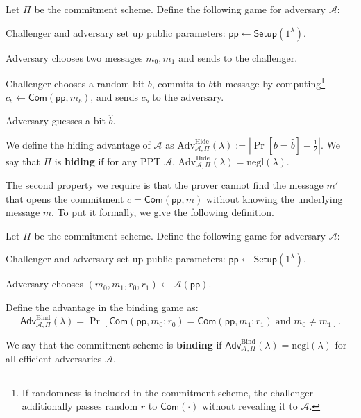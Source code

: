 \documentclass[../../book]{subfiles}
\begin{document}
\begin{definition}\label{def:hiding}
    Let $\Pi$ be the commitment scheme. Define the following game for adversary $\mathcal{A}$:
    \begin{algoen}
        \item Challenger and adversary set up public parameters: $\mathsf{pp} \gets \mathsf{Setup}(1^{\lambda})$.
        \item Adversary chooses two messages $m_0,m_1$ and sends to the challenger.
        \item Challenger chooses a random bit $b$, commits to $b$th message by computing\footnote{If randomness is included in the commitment scheme, the challenger additionally passes random $r$ to $\mathsf{Com}(\cdot)$ without revealing it to $\mathcal{A}$.} $c_b \gets \mathsf{Com}(\mathsf{pp}, m_b)$, and sends $c_b$ to the adversary.
        \item Adversary guesses a bit $\hat{b}$.
    \end{algoen}

    We define the hiding advantage of $\mathcal{A}$ as $\text{Adv}^{\text{Hide}}_{\mathcal{A},\Pi}(\lambda) := \left| \Pr[b=\hat{b}] - \frac{1}{2} \right|$.
    We say that $\Pi$ is \textbf{hiding} if for any PPT $\mathcal{A}$, $\text{Adv}^{\text{Hide}}_{\mathcal{A},\Pi}(\lambda) = \text{negl}(\lambda)$.
\end{definition}

The second property we require is that the prover cannot find the message $m'$ that opens the commitment $c=\mathsf{Com}(\mathsf{pp}, m)$ without knowing the underlying message $m$.
To put it formally, we give the following definition.

\begin{definition}
    Let $\Pi$ be the commitment scheme. Define the following game for adversary $\mathcal{A}$:
    \begin{algoen}
        \item Challenger and adversary set up public parameters: $\mathsf{pp} \gets \mathsf{Setup}(1^{\lambda})$.
        \item Adversary chooses $(m_0,m_1,r_0,r_1) \gets \mathcal{A}(\mathsf{pp})$.
    \end{algoen}
        
    Define the advantage in the binding game as:
    \begin{equation*}
        \mathsf{Adv}^{\text{Bind}}_{\mathcal{A}, \Pi}(\lambda) = \Pr[\mathsf{Com}(\mathsf{pp}, m_0; r_0) = \mathsf{Com}(\mathsf{pp}, m_1; r_1) \; \text{and} \; m_0 \neq m_1].
    \end{equation*}

    We say that the commitment scheme is \textbf{binding} if $\mathsf{Adv}^{\text{Bind}}_{\mathcal{A}, \Pi}(\lambda)=\text{negl}(\lambda)$ for all efficient adversaries $\mathcal{A}$.
\end{definition}
\end{document}

